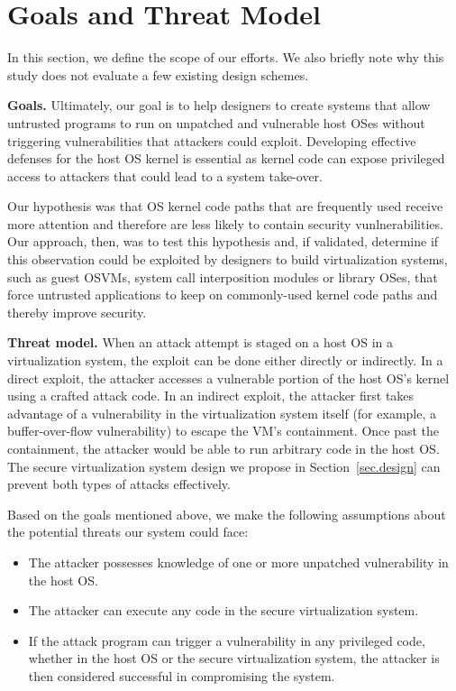 \section{Goals and Threat Model}
\label{sec.motivation-and-background}

In this section, we define the scope of our efforts. We also briefly note why
this study does not evaluate a few existing design schemes.

\noindent
\textbf{Goals.}
Ultimately, our goal is to help designers to
create systems that allow untrusted programs to 
run on unpatched and vulnerable host OSes without triggering vulnerabilities that attackers could exploit. 
Developing effective defenses for the host OS kernel is essential as kernel code 
can expose privileged access to attackers that could lead to a system take-over.

Our hypothesis was that OS kernel code paths that are frequently used receive
more
attention and therefore are less likely to contain security vunlnerabilities.
Our approach, then, was to test this hypothesis and, if validated, determine
if this observation could be exploited by designers to build 
virtualization systems, such as guest OSVMs, system call interposition modules
or library OSes, that force untrusted applications to keep on commonly-used kernel
code paths and thereby improve security.



\noindent
\textbf{Threat model.}
When an attack attempt is staged
on a host OS in a virtualization system,
the exploit can be done either directly or indirectly.
In a direct exploit, the attacker accesses a vulnerable portion of the host OS's kernel
using a crafted attack code. In an indirect exploit,
the attacker first takes advantage of a vulnerability in the virtualization system itself
(for example, a buffer-over-flow vulnerability)
to escape the VM's containment. Once past the containment, the attacker would be able to run arbitrary code
in the host OS.
The secure virtualization system design we propose
in Section~\ref{sec.design} can prevent both types of attacks effectively.

Based on the goals mentioned above, we make the following assumptions about the
potential threats our system could face:

\begin{itemize}\setlength\itemsep{0em}

\item The attacker possesses knowledge of one or more unpatched
vulnerability in the host OS.

\item The attacker can execute any code in the secure
virtualization system.

\item If the attack program can trigger a vulnerability in any privileged
code, whether in the host OS or the secure virtualization system, the attacker
is then considered successful in compromising the system.

\end{itemize}

